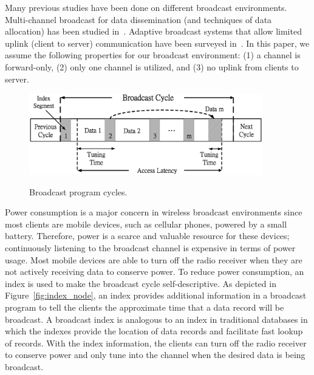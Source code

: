 Many previous studies have been done on different broadcast
environments. Multi-channel broadcast for data dissemination (and
techniques of data allocation) has been studied
in~\cite{conf/cikm/HsuLC01,conf/cikm/YeeN03,conf/mobicom/HameedV97}.
Adaptive broadcast systems that allow limited uplink (client to
server) communication have been surveyed
in~\cite{journals/pieee/Wong88}. In this paper, we assume the
following properties for our broadcast environment: (1) a channel
is forward-only, (2) only one channel is utilized, and (3) no
uplink from clients to server.

\begin{figure}[!h]
\begin{center}
\includegraphics[width=4in]{Figures/BroadcastCycle.eps}
\vspace*{-15pt} \caption{Broadcast program cycles.}\vspace*{-10pt}
\label{fig:bcastcycle}
\end{center}
\end{figure}

Power consumption is a major concern in wireless broadcast
environments since most clients are mobile devices, such as
cellular phones, powered by a small battery. Therefore, power is a
scarce and valuable resource for these devices; continuously
listening to the broadcast channel is expensive in terms of power
usage. Most mobile devices are able to turn off the radio receiver
when they are not actively receiving data to conserve power. To
reduce power consumption, an index is used to make the broadcast
cycle self-descriptive. As depicted in
Figure~\ref{fig:index_node}, an index provides additional
information in a broadcast program to tell the clients the
approximate time that a data record will be broadcast. A broadcast
index is analogous to an index in traditional databases in which
the indexes provide the location of data records and facilitate
fast lookup of records. With the index information, the clients
can turn off the radio receiver to conserve power and only tune
into the channel when the desired data is being broadcast.

